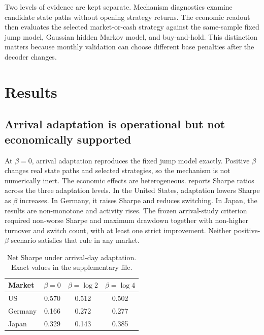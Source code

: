 Two levels of evidence are kept separate. Mechanism diagnostics examine candidate
state paths without opening strategy returns. The economic readout then evaluates
the selected market-or-cash strategy against the same-sample fixed jump model,
Gaussian hidden Markov model, and buy-and-hold. This distinction matters because
monthly validation can choose different base penalties after the decoder changes.

\section{Results}

\subsection{Arrival adaptation is operational but not economically supported}

At $\beta=0$, arrival adaptation reproduces the fixed jump model exactly. Positive
$\beta$ changes real state paths and selected strategies, so the mechanism is not
numerically inert. The economic effects are heterogeneous. 
reports Sharpe ratios across the three adaptation levels. In the United States,
adaptation lowers Sharpe as $\beta$ increases. In Germany, it raises Sharpe and
reduces switching. In Japan, the results are non-monotone and activity rises. The
frozen arrival-study criterion required non-worse Sharpe and maximum drawdown
together with non-higher turnover and switch count, with at least one strict
improvement. Neither positive-$\beta$ scenario satisfies that rule in any market.

\begin{table}[t]
\centering
\caption{Net Sharpe under arrival-day adaptation. Exact values in the
supplementary file.}
\label{tab:arrival}
\begin{threeparttable}
\begin{tabular}{l S[table-format=1.3] S[table-format=1.3] S[table-format=1.3]}
\toprule
Market & {$\beta=0$} & {$\beta=\log 2$} & {$\beta=\log 4$} \\
\midrule
US      & 0.570 & 0.512 & 0.502 \\
Germany & 0.166 & 0.272 & 0.277 \\
Japan   & 0.329 & 0.143 & 0.385 \\
\bottomrule
\end{tabular}
\end{threeparttable}
\end{table}

